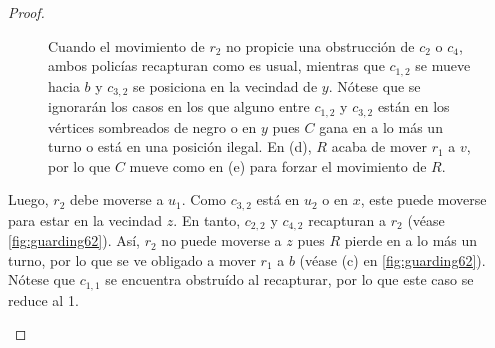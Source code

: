 \begin{proof}
\begin{enumerate}
\begin{enumerate}
\begin{figure}[ht!]
\begin{tcbitemize}
{\begin{tikzpicture}
                                \end{tikzpicture}
                            }
                \end{tcbitemize}
                \captionsetup{font=footnotesize}
                \caption{Cuando el movimiento de $r_2$ no propicie una
                obstrucci\'on de $c_2$ o $c_4$, ambos polic\'ias recapturan como
                es usual, mientras que $c_{1,2}$ se mueve hacia $b$ y $c_{3,2}$
                se posiciona en la vecindad de $y$. N\'otese que se ignorar\'an
                los casos en los que alguno entre $c_{1,2}$ y $c_{3,2}$ est\'an
                en los v\'ertices sombreados de negro o en $y$ pues $C$ gana en
                a lo m\'as un turno o est\'a en una posici\'on ilegal. En (d),
                $R$ acaba de mover $r_1$ a $v$, por lo que $C$ mueve como en (e)
                para forzar el movimiento de $R$.}
                \label{fig:guarding1}
            \end{figure}

            Luego, $r_2$ debe moverse a $u_1$. Como $c_{3,2}$ est\'a en $u_2$ o
            en $x$, este puede moverse para estar en la vecindad $z$. En tanto,
            $c_{2,2}$ y $c_{4,2}$ recapturan a $r_2$ (v\'ease
            \cref{fig:guarding62}). As\'i, $r_2$ no puede moverse a $z$ pues $R$
            pierde en a lo m\'as un turno, por lo que se ve obligado a mover
            $r_1$ a $b$ (v\'ease (c) en \cref{fig:guarding62}). N\'otese que
            $c_{1,1}$ se encuentra obstru\'ido al recapturar, por lo que este
            caso se reduce al 1.

            \begin{figure}[ht!]
                \begin{tcbitemize}[raster columns=2, raster equal height, enhanced,
                    colback=Black!5!white,colframe=Grey!75!black, attach title to upper,
                    phantom={\setcounter{myrasternum}{\thetcbrasternum}},
                    title={(\alph{myrasternum})\enspace}, halign lower=center, halign
                    upper = left, lower separated=false, middle=0mm, boxsep=0mm,
                    leftupper=2mm, left=2mm, right=2mm, fonttitle=\bfseries,
                    coltitle=black, raster column skip=1mm,raster halign=center, raster
                    row skip=1mm]
        
                    \tcbitem
                        \tcblower
\end{tcbitemize}
\end{figure}
\end{enumerate}
\end{enumerate}
\end{proof}
